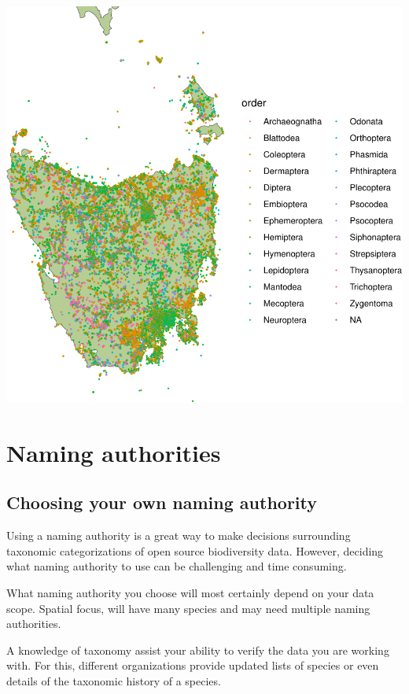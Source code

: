 \documentclass[
  letterpaper,
  DIV=11,
  numbers=noendperiod,
  oneside]{scrreprt}
\begin{document}
\includegraphics{scope_files/figure-pdf/unnamed-chunk-2-1.pdf}

\hypertarget{naming-authorities}{%
\section{Naming authorities}\label{naming-authorities}}

\hypertarget{choosing-your-own-naming-authority}{%
\subsection{Choosing your own naming
authority}\label{choosing-your-own-naming-authority}}

Using a naming authority is a great way to make decisions surrounding
taxonomic categorizations of open source biodiversity data. However,
deciding what naming authority to use can be challenging and time
consuming.

What naming authority you choose will most certainly depend on your data
scope. Spatial focus, will have many species and may need multiple
naming authorities.

A knowledge of taxonomy assist your ability to verify the data you are
working with. For this, different organizations provide updated lists of
species or even details of the taxonomic history of a species.
\end{document}
